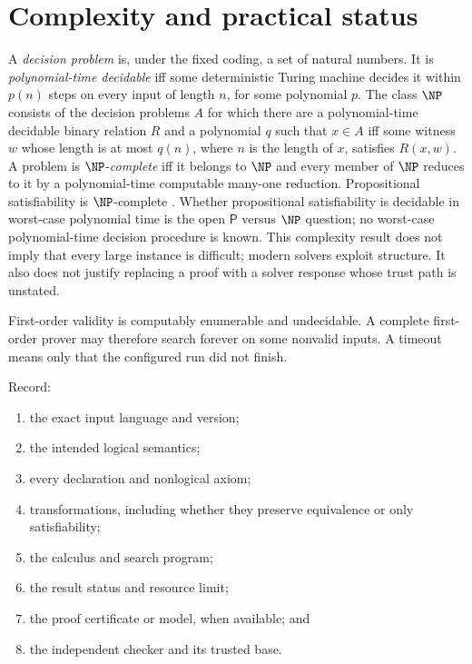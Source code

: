 \section{Complexity and practical status}
\label{sec:automated-reasoning-07}

A \emph{decision problem} is, under the fixed coding, a set of natural
numbers.  It is \emph{polynomial-time decidable} iff some deterministic
Turing machine decides it within \(p(n)\) steps on every input of length
\(n\), for some polynomial \(p\).  The class \(\NP\) consists of the
decision problems \(A\) for which there are a polynomial-time decidable
binary relation \(R\) and a polynomial \(q\) such that \(x\in A\) iff
some witness \(w\) whose length is at most \(q(n)\), where \(n\) is
the length of \(x\), satisfies \(R(x,w)\).  A problem is \(\NP\)-\emph{complete} iff
it belongs to \(\NP\) and every member of \(\NP\) reduces to it by a
polynomial-time computable many-one reduction.  Propositional
satisfiability is \(\NP\)-complete \cite{Cook1971}.  Whether
propositional satisfiability is decidable in worst-case polynomial time is
the open \(\mathsf P\) versus \(\NP\) question; no worst-case
polynomial-time decision procedure is known.  This complexity
result does not imply that every large instance is difficult; modern solvers
exploit structure.  It also does not justify replacing a proof with a solver
response whose trust path is unstated.

First-order validity is computably enumerable and undecidable.  A complete
first-order prover may therefore search forever on some nonvalid inputs.  A
timeout means only that the configured run did not finish.

\begin{method}
Record:
\begin{enumerate}
  \item the exact input language and version;
  \item the intended logical semantics;
  \item every declaration and nonlogical axiom;
  \item transformations, including whether they preserve equivalence or only
        satisfiability;
  \item the calculus and search program;
  \item the result status and resource limit;
  \item the proof certificate or model, when available; and
  \item the independent checker and its trusted base.
\end{enumerate}
\end{method}
